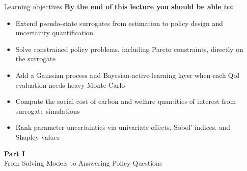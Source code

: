 \documentclass[aspectratio=169,11pt]{beamer}
\begin{document}
\begin{frame}{Learning objectives}
\textbf{By the end of this lecture you should be able to:}
\begin{itemize}
  \item Extend pseudo-state surrogates from estimation to policy design and uncertainty quantification
  \item Solve constrained policy problems, including Pareto constraints, directly on the surrogate
  \item Add a Gaussian process and Bayesian-active-learning layer when each QoI evaluation needs heavy Monte Carlo
  \item Compute the social cost of carbon and welfare quantities of interest from surrogate simulations
  \item Rank parameter uncertainties via univariate effects, Sobol' indices, and Shapley values
\end{itemize}
\end{frame}



\begin{frame}{}
\vfill
\begin{center}
{\Huge \textcolor{uzhblue}{\textbf{Part I}}}\\[12pt]
{\LARGE From Solving Models to Answering Policy Questions}
\end{center}
\vfill
\end{frame}
\end{document}
